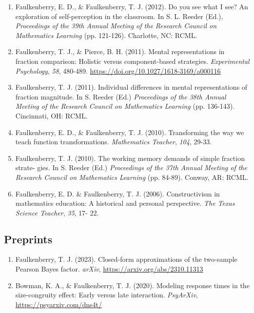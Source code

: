 \documentclass[article,10pt]{article}
\begin{document}
\begin{enumerate}
\item Faulkenberry, E. D., \& Faulkenberry, T. J. (2012). Do you see what I see? An exploration of self-perception in the classroom. In S. L. Reeder (Ed.), \emph{Proceedings of the 39th Annual Meeting of the Research Council on Mathematics Learning} (pp. 121-126). Charlotte, NC: RCML.
\item Faulkenberry, T. J., \& Pierce, B. H. (2011). Mental representations in fraction comparison: Holistic versus component-based strategies. \emph{Experimental Psychology}, \emph{58}, 480-489. \url{https://doi.org/}\href{http://dx.doi.org/10.1027/1618-3169/a000116}{10.1027/1618-3169/a000116}
\item Faulkenberry, T. J. (2011). Individual differences in mental representations of fraction magnitude. In S. Reeder (Ed.) \emph{Proceedings of the 38th Annual Meeting of the Research Council on Mathematics Learning} (pp. 136-143). Cincinnati, OH: RCML.
\item Faulkenberry, E. D., \& Faulkenberry, T. J. (2010). Transforming the way we teach function transformations. \emph{Mathematics Teacher}, \emph{104}, 29-33.
\item Faulkenberry, T. J. (2010). The working memory demands of simple fraction strate- gies. In S. Reeder (Ed.) \emph{Proceedings of the 37th Annual Meeting of the Research Council on Mathematics Learning} (pp. 84-89). Conway, AR: RCML.
\item Faulkenberry, E. D. \& Faulkenberry, T. J. (2006). Constructivism in mathematics education: A historical and personal perspective. \emph{The Texas Science Teacher}, \emph{35}, 17- 22.
\end{enumerate}

\subsection*{Preprints}
\label{sec:org088101e}
\begin{enumerate}
\item Faulkenberry, T. J. (2023). Closed-form approximations of the two-sample Pearson Bayes factor. \emph{arXiv}, \url{https://arxiv.org/abs/2310.11313}
\item Bowman, K. A., \& Faulkenberry, T. J. (2020). Modeling response times in the size-congruity effect: Early versus late interaction. \emph{PsyArXiv}, \url{https://psyarxiv.com/dns4t/}
\end{enumerate}
\end{document}
